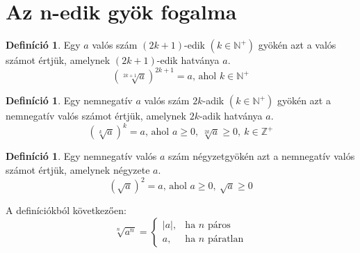 \documentclass[twoside,12pt]{report}
\theoremstyle{definition}
\newtheorem{definition}[theorem]{Definíció}
\begin{document}
\section{Az n-edik gyök fogalma}
	\begin{definition}
		Egy $a$ valós szám $(2k+1)$-edik $(k\in\mathbb{N}^+)$ gyökén azt a valós számot értjük, amelynek $(2k + 1)$-edik hatványa $a$. 
		\begin{equation*}
		\left(\sqrt[2k+1]{a}\right)^{2k+1}=a\text{, ahol }k\in\mathbb{N}^+
		\end{equation*}
	\end{definition}
	\begin{definition}
		Egy nemnegatív $a$ valós szám $2k$-adik $(k\in\mathbb{N}^+)$ gyökén azt a nemnegatív valós számot értjük, amelynek $2k$-adik hatványa $a$.
		\begin{equation*}
			\left(\sqrt[k]{a}\right)^k=a\text{, ahol } a\ge0,\ \sqrt[2k]{a}\ge0,\ k\in\mathbb{Z}^+
		\end{equation*}
	\end{definition}
	\begin{definition}
		Egy nemnegatív valós $a$ szám négyzetgyökén azt a nemnegatív valós számot értjük,
		amelynek négyzete $a$.
		\begin{equation*}
			\left(\sqrt{a}\right)^2=a\text{, ahol } a\ge0,\ \sqrt{a}\ge0
		\end{equation*}
	\end{definition}
	A definíciókból következően:
	\begin{equation*}
		\sqrt[n]{a^n}=
		\begin{cases}
			|a|, & \text{ha $n$ páros}\\
			a, & \text{ha $n$ páratlan}
		\end{cases}
	\end{equation*}
\end{document}
